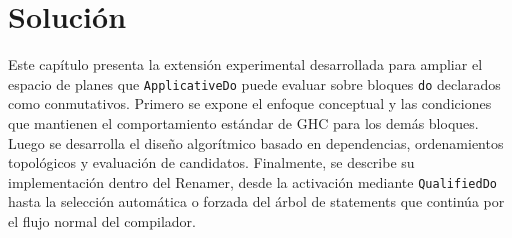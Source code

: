 
\chapter{Solución}

Este capítulo presenta la extensión experimental desarrollada para ampliar el espacio de planes que \texttt{ApplicativeDo} puede evaluar sobre bloques \texttt{do} declarados como conmutativos. Primero se expone el enfoque conceptual y las condiciones que mantienen el comportamiento estándar de \textsf{GHC} para los demás bloques. Luego se desarrolla el diseño algorítmico basado en dependencias, ordenamientos topológicos y evaluación de candidatos. Finalmente, se describe su implementación dentro del Renamer, desde la activación mediante \texttt{QualifiedDo} hasta la selección automática o forzada del árbol de statements que continúa por el flujo normal del compilador.




